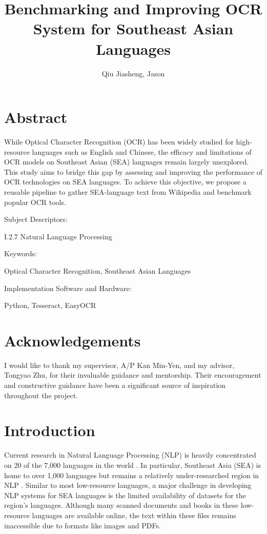 \documentclass[12pt,oneside]{memoir}
\title{Benchmarking and Improving OCR System for Southeast Asian Languages}
\author{Qiu Jiasheng, Jason}
\begin{document}
\frontmatter

\pagestyle{plain}

\makecover

\setcounter{page}{1}

\maketitle

\chapter{Abstract}
While Optical Character Recognition (OCR) has been widely studied for high-resource languages such as English and Chinese, the efficacy and limitations of OCR models on Southeast Asian (SEA) languages remain largely unexplored.
This study aims to bridge this gap by assessing and improving the performance of OCR technologies on SEA languages.
To achieve this objective, we propose a reusable pipeline to gather SEA-language text from Wikipedia and benchmark popular OCR tools.

\vspace{20pt}
Subject Descriptors:

\hspace*{0.3in} I.2.7 Natural Language Processing

Keywords:

\hspace*{0.3in} Optical Character Recognition, Southeast Asian Languages

Implementation Software and Hardware:

\hspace*{0.3in} Python, Tesseract, EasyOCR

\chapter{Acknowledgements}
I would like to thank my supervisor, A/P Kan Min-Yen, and my advisor, Tongyao Zhu, for their invaluable guidance and mentorship. Their encouragement and constructive guidance have been a significant source of inspiration throughout the project.

\listoffigures
\listoftables
\tableofcontents

\mainmatter

\chapter{Introduction}
Current research in Natural Language Processing (NLP) is heavily concentrated on 20 of the 7,000 languages in the world \parencite{magueresse-etal-2020}.
In particular, Southeast Asia (SEA) is home to over 1,000 languages but remains a relatively under-researched region in NLP \parencite{aji-etal-2023}.
Similar to most low-resource languages, a major challenge in developing NLP systems for SEA languages is the limited availability of datasets for the region’s languages.
Although many scanned documents and books in these low-resource languages are available online, the text within these files remains inaccessible due to formats like images and PDFs.
\end{document}
